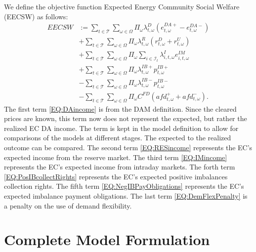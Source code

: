 \documentclass{article}
\begin{document}
We define the objective function Expected Energy Community Social Welfare (EECSW) as follows:
\begin{subequations}
	\begin{align}
    EECSW & := \sum_{t \in \mathcal{T}} \sum_{\omega \in \Omega} \Pi_{\omega} \lambda^D_{t, \omega} (e^{DA+}_{t, \omega} - e^{DA-}_{t, \omega}) \label{EQ:DAincome} \\
		& + \sum_{t \in \mathcal{T}} \sum_{\omega \in \Omega} \Pi_{\omega} \lambda^R_{t, \omega} (r^D_{t, \omega} + r^U_{t, \omega}) \label{EQ:RESincome} \\
		& + \sum_{t \in \mathcal{T}} \sum_{\omega \in \Omega} \Pi_{\omega} \sum_{i \in \mathcal{I}_t} \lambda^{I}_{i, t, \omega} e^{IM}_{i, t, \omega} \label{EQ:IMincome} \\
		& + \sum_{t \in \mathcal{T}} \sum_{\omega \in \Omega} \Pi_{\omega} \lambda^{IB+}_{t, \omega} p^{IB+}_{t, \omega} \label{EQ:PosIBcollectRights} \\
		& - \sum_{t \in \mathcal{T}} \sum_{\omega \in \Omega} \Pi_{\omega} \lambda^{IB-}_{t, \omega} p^{IB-}_{t, \omega} \label{EQ:NegIBPayObligations} \\
		& - \sum_{t \in \mathcal{T}} \sum_{\omega \in \Omega} \Pi_{\omega} C^{FD} (afd^+_{t, \omega} + afd^-_{t, \omega}). \label{EQ:DemFlexPenalty}
	\end{align}
	\label{EQ:EECSW}
\end{subequations}
The first term \eqref{EQ:DAincome} is from the DAM definition. Since the cleared prices are known, this term now does not represent the expected, but rather the realized EC DA income. The term is kept in the model definition to allow for comparisons of the models at different stages. The expected to the realized outcome can be compared.
The second term \eqref{EQ:RESincome} represents the EC's expected income from the reserve market. The third term \eqref{EQ:IMincome} represents the EC's expected income from intraday markets. The forth term \eqref{EQ:PosIBcollectRights} represents the EC's expected positive imbalances collection rights. The fifth term \eqref{EQ:NegIBPayObligations} represents the EC's expected imbalance payment obligations. The last term \eqref{EQ:DemFlexPenalty} is a penalty on the use of demand flexibility.

\section{Complete Model Formulation}
\label{SEC:CompleteModelFormulation}
\end{document}

